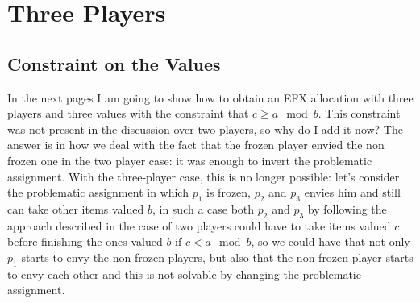 \chapter{Three Players}
\section{Constraint on the Values}
In the next pages I am going to show how to obtain an EFX allocation with three players and three values with the constraint that $c\ge a\mod b$. This constraint was not present in the discussion over two players, so why do I add it now? The answer is in how we deal with the fact that the frozen player envied the non frozen one in the two player case: it was enough to invert the problematic assignment. With the three-player case, this is no longer possible: let's consider the problematic assignment in which $p_1$ is frozen, $p_2$ and $p_3$ envies him and still can take other items valued $b$, in such a case both $p_2$ and $p_3$ by following the approach described in the case of two players could have to take items valued $c$ before finishing the ones valued $b$ if $c< a\mod b$, so we could have that not only $p_1$ starts to envy the non-frozen players, but also that the non-frozen player starts to envy each other and this is not solvable by changing the problematic assignment.
